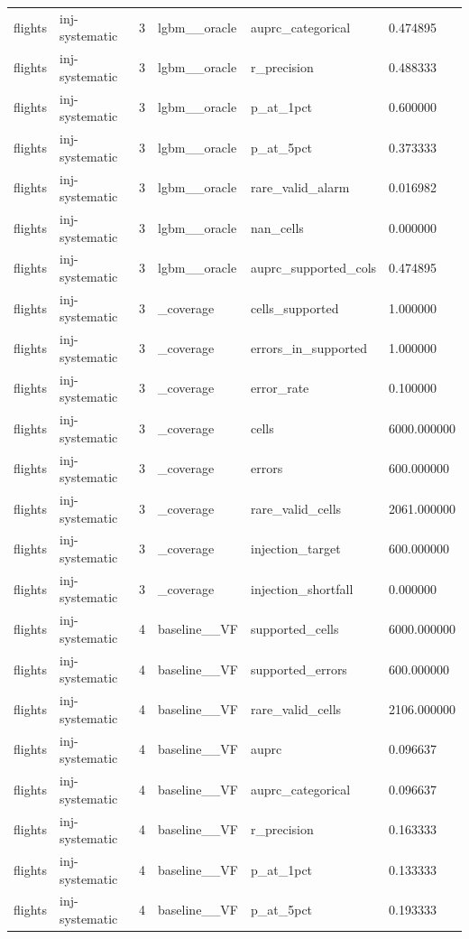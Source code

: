 \begin{tabular}{llllll}
flights & inj-systematic & 3 & lgbm\_\_oracle & auprc\_categorical & 0.474895 \\
flights & inj-systematic & 3 & lgbm\_\_oracle & r\_precision & 0.488333 \\
flights & inj-systematic & 3 & lgbm\_\_oracle & p\_at\_1pct & 0.600000 \\
flights & inj-systematic & 3 & lgbm\_\_oracle & p\_at\_5pct & 0.373333 \\
flights & inj-systematic & 3 & lgbm\_\_oracle & rare\_valid\_alarm & 0.016982 \\
flights & inj-systematic & 3 & lgbm\_\_oracle & nan\_cells & 0.000000 \\
flights & inj-systematic & 3 & lgbm\_\_oracle & auprc\_supported\_cols & 0.474895 \\
flights & inj-systematic & 3 & \_coverage & cells\_supported & 1.000000 \\
flights & inj-systematic & 3 & \_coverage & errors\_in\_supported & 1.000000 \\
flights & inj-systematic & 3 & \_coverage & error\_rate & 0.100000 \\
flights & inj-systematic & 3 & \_coverage & cells & 6000.000000 \\
flights & inj-systematic & 3 & \_coverage & errors & 600.000000 \\
flights & inj-systematic & 3 & \_coverage & rare\_valid\_cells & 2061.000000 \\
flights & inj-systematic & 3 & \_coverage & injection\_target & 600.000000 \\
flights & inj-systematic & 3 & \_coverage & injection\_shortfall & 0.000000 \\
flights & inj-systematic & 4 & baseline\_\_VF & supported\_cells & 6000.000000 \\
flights & inj-systematic & 4 & baseline\_\_VF & supported\_errors & 600.000000 \\
flights & inj-systematic & 4 & baseline\_\_VF & rare\_valid\_cells & 2106.000000 \\
flights & inj-systematic & 4 & baseline\_\_VF & auprc & 0.096637 \\
flights & inj-systematic & 4 & baseline\_\_VF & auprc\_categorical & 0.096637 \\
flights & inj-systematic & 4 & baseline\_\_VF & r\_precision & 0.163333 \\
flights & inj-systematic & 4 & baseline\_\_VF & p\_at\_1pct & 0.133333 \\
flights & inj-systematic & 4 & baseline\_\_VF & p\_at\_5pct & 0.193333 \\

\end{tabular}
